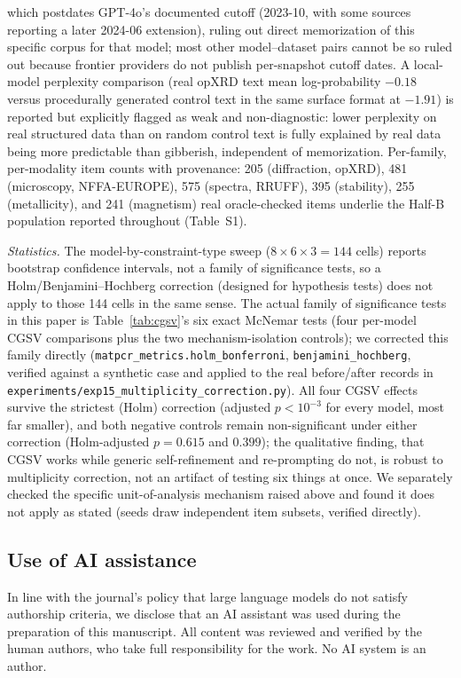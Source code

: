 \documentclass[pdflatex,sn-nature]{sn-jnl}
\begin{document}
which postdates GPT-4o's documented cutoff (2023-10, with some sources reporting a later
2024-06 extension), ruling out direct memorization of this specific corpus for that model;
most other model--dataset pairs cannot be so ruled out because frontier providers do not
publish per-snapshot cutoff dates. A local-model perplexity comparison (real opXRD text
mean log-probability $-0.18$ versus procedurally generated control text in the same surface
format at $-1.91$) is reported but explicitly flagged as weak and non-diagnostic: lower
perplexity on real structured data than on random control text is fully explained by real
data being more predictable than gibberish, independent of memorization. Per-family,
per-modality item counts with provenance: 205 (diffraction, opXRD), 481 (microscopy,
NFFA-EUROPE), 575 (spectra, RRUFF), 395 (stability), 255 (metallicity), and 241 (magnetism)
real oracle-checked items underlie the Half-B population reported throughout (Table~S1).

\noindent\emph{Statistics.} The model-by-constraint-type sweep ($8\times6\times3=144$ cells)
reports bootstrap confidence intervals, not a family of significance tests, so a
Holm/Benjamini--Hochberg correction (designed for hypothesis tests) does not apply to those
144 cells in the same sense. The actual family of significance tests in this paper is
Table~\ref{tab:cgsv}'s six exact McNemar tests (four per-model CGSV comparisons plus the two
mechanism-isolation controls); we corrected this family directly
(\texttt{matpcr\_metrics.holm\_bonferroni}, \texttt{benjamini\_hochberg}, verified against a
synthetic case and applied to the real before/after records in
\texttt{experiments/exp15\_multiplicity\_correction.py}). All four CGSV effects survive the
strictest (Holm) correction (adjusted $p<10^{-3}$ for every model, most far smaller), and
both negative controls remain non-significant under either correction (Holm-adjusted
$p=0.615$ and $0.399$); the qualitative finding, that CGSV works while generic
self-refinement and re-prompting do not, is robust to multiplicity correction, not an
artifact of testing six things at once. We separately checked the specific unit-of-analysis
mechanism raised above and found it does not apply as stated (seeds draw independent item
subsets, verified directly).

\subsection*{Use of AI assistance}
In line with the journal's policy that large language models do not satisfy
authorship criteria, we disclose that an AI assistant was used during the preparation of
this manuscript. All content was reviewed and verified by the human authors, who take
full responsibility for the work. No AI system is an author.
\end{document}

